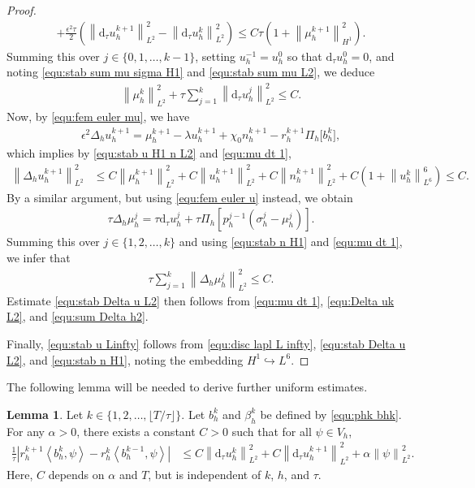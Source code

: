 \documentclass[11pt, reqno]{amsart}
\theoremstyle{definition}
\newtheorem{lemma}[theorem]{Lemma}
\numberwithin{equation}{section}
\newcommand{\dtt}{\mathrm{d}_\tau}
\newcommand{\norm}[2]{\left\|{#1}\right\|_{#2}}
\newcommand{\inpro}[2]{\left\langle#1,#2\right\rangle}
\begin{document}
\begin{proof}
\begin{align*}
	+
	\frac{\epsilon^2 \tau}{2} \left(\norm{\dtt u_h^{k+1}}{L^2}^2- \norm{\dtt u_h^k}{L^2}^2 \right)
	\leq
	C\tau\left(1+ \norm{\mu_h^{k+1}}{H^1}^2 \right).
\end{align*}
Summing this over $j\in \{0,1,\ldots,k-1\}$, setting $u_h^{-1}=u_h^0$ so that $\dtt u_h^0=0$, and noting \eqref{equ:stab sum mu sigma H1} and \eqref{equ:stab sum mu L2}, we deduce
\begin{align}\label{equ:mu dt 1}
	\norm{\mu_h^k}{L^2}^2 + \tau \sum_{j=1}^k \norm{\dtt u_h^j}{L^2}^2 \leq C.
\end{align}
Now, by \eqref{equ:fem euler mu}, we have
\begin{align*}
	\epsilon^2 \Delta_h u_h^{k+1}= \mu_h^{k+1}-\lambda u_h^{k+1} + \chi_0 n_h^{k+1} -  r_h^{k+1}
	\Pi_h \big[b_h^k \big],
\end{align*}
which implies by \eqref{equ:stab u H1 n L2} and \eqref{equ:mu dt 1},
\begin{align}\label{equ:Delta uk L2}
	\norm{\Delta_h u_h^{k+1}}{L^2}^2
	&\leq
	C\norm{\mu_h^{k+1}}{L^2}^2
	+
	C\norm{u_h^{k+1}}{L^2}^2
	+
	C\norm{n_h^{k+1}}{L^2}^2
	+
	C \left(1+ \norm{u_h^k}{L^6}^6\right) \leq C.
\end{align}
By a similar argument, but using \eqref{equ:fem euler u} instead, we obtain
\begin{align*}
	\tau\Delta_h \mu_h^j= \tau \dtt u_h^j+ \tau \Pi_h \left[p_h^{j-1} (\sigma_h^j-\mu_h^j)\right].
\end{align*}
Summing this over $j\in \{1,2,\ldots,k\}$ and using \eqref{equ:stab n H1} and \eqref{equ:mu dt 1}, we infer that
\begin{align}\label{equ:sum Delta h2}
	\tau \sum_{j=1}^k \norm{\Delta_h \mu_h^j}{L^2}^2
	\leq C.
\end{align}
Estimate \eqref{equ:stab Delta u L2} then follows from \eqref{equ:mu dt 1}, \eqref{equ:Delta uk L2}, and \eqref{equ:sum Delta h2}. 

Finally, \eqref{equ:stab u Linfty} follows from \eqref{equ:disc lapl L infty}, \eqref{equ:stab Delta u L2}, and \eqref{equ:stab n H1}, noting the embedding $H^1\hookrightarrow L^6$.
\end{proof}

The following lemma will be needed to derive further uniform estimates.

\begin{lemma}
Let $k \in \{1,2,\ldots,\lfloor T/\tau \rfloor\}$. {Let $b_h^k$ and $\beta_h^k$ be defined by \eqref{equ:phk bhk}.} For any $\alpha>0$, there exists a constant $C>0$ such that for all $\psi\in V_h$,
\begin{align}\label{equ:ineq 2 rhk f}
	\frac{1}{\tau} \left|r_h^{k+1} \inpro{b_h^k}{\psi}
	-
	r_h^k \inpro{b_h^{k-1}}{\psi} \right| 
	&\leq 
	C\norm{\dtt u_h^k}{L^2}^2 + C\norm{\dtt u_h^{k+1}}{L^2}^2
	+ \alpha \norm{\psi}{L^2}^2.
\end{align}
Here, $C$ depends on $\alpha$ and $T$, but is independent of $k$, $h$, and $\tau$.
\end{lemma}
\end{document}

